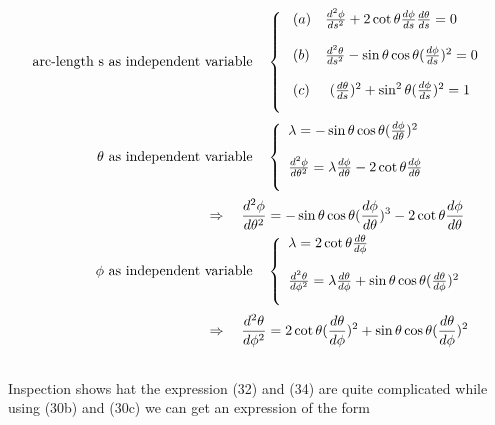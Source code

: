 \begin{align}
\text{arc-length s as independent variable}\quad& \left \{ \begin{array}{ll}
\ (a)&\dv[2]{\phi}{s} + 2 \cot\theta\dv{\phi}{s} \dv{\theta}{s} = 0\\\\
\ (b)&\dv[2]{\theta}{s} - \sin\theta\cos\theta(\dv{\phi}{s})^2  = 0\\\\
\ (c)&\ (\dv{\theta}{s})^2+\sin^2\theta(\dv{\phi}{s})^2 = 1\\\\
\end{array}\right.\\
\theta \text{ as independent variable}\quad& \left \{ \begin{array}{l}
\lambda =  - \sin\theta\cos\theta(\dv{\phi}{\theta})^2\\\\
\dv[2]{\phi}{\theta}  = \lambda \dv{\phi}{\theta}- 2 \cot\theta\dv{\phi}{\theta}  \\\\
\end{array}\right.\\
\Rightarrow \quad \dv[2]{\phi}{\theta}  &= - \sin\theta\cos\theta(\dv{\phi}{\theta})^3- 2 \cot\theta\dv{\phi}{\theta}  \\
\phi \text{ as independent variable}\quad& \left \{ \begin{array}{l}
\lambda =  2 \cot\theta\dv{\theta}{\phi}\\\\
\dv[2]{\theta}{\phi}  = \lambda \dv{\theta}{\phi} + \sin\theta\cos\theta(\dv{\theta}{\phi})^2 \\\\
\end{array}\right.\\
\Rightarrow \quad \dv[2]{\theta}{\phi}  &= 2 \cot\theta(\dv{\theta}{\phi})^2 + \sin\theta\cos\theta(\dv{\theta}{\phi})^2 \\
\
\end{align}
Inspection shows hat the expression (32) and (34) are quite complicated while using (30b) and (30c) we can get an expression of the form
